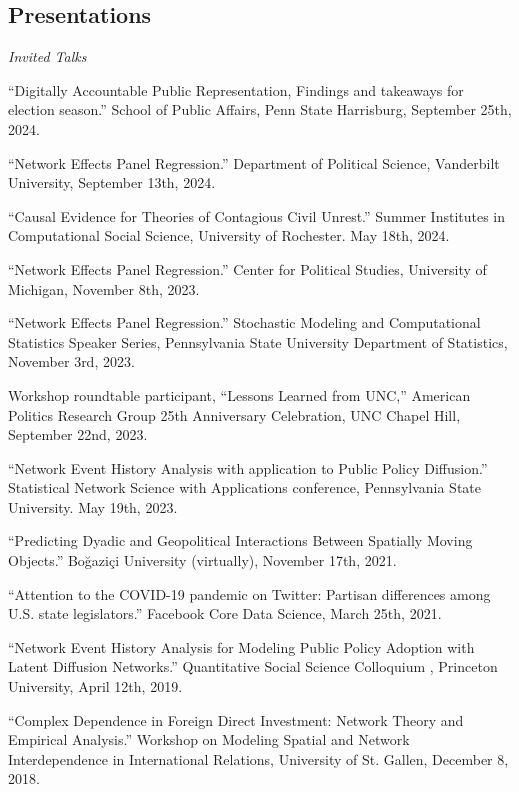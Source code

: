 \documentclass[overlapped,line]{res}
\begin{document}
\begin{resume}
\section{\bf Presentations}
\vspace{.1cm}
\hspace{-1cm} \emph{Invited Talks}
\begin{etaremune} 
\item ``Digitally Accountable Public Representation, Findings and takeaways for election season.'' School of Public Affairs, Penn State Harrisburg, September 25th, 2024. 
\item ``Network Effects Panel Regression.'' Department of Political Science, Vanderbilt University, September 13th, 2024.
\item ``Causal Evidence for Theories of Contagious Civil Unrest.'' Summer Institutes in Computational Social Science, University of Rochester. May 18th, 2024. 
\item ``Network Effects Panel Regression.'' Center for Political Studies, University of Michigan, November 8th, 2023.
\item ``Network Effects Panel Regression.'' Stochastic Modeling and Computational Statistics Speaker Series, Pennsylvania State University Department of Statistics, November 3rd, 2023.
\item Workshop roundtable participant, ``Lessons Learned from UNC,'' American Politics Research Group 25th Anniversary Celebration, UNC Chapel Hill, September 22nd, 2023. 
\item ``Network Event History Analysis with application to Public Policy Diffusion.'' Statistical Network Science with Applications conference, Pennsylvania State University. May 19th, 2023.
\item ``Predicting Dyadic and Geopolitical Interactions Between Spatially Moving Objects.'' Boğaziçi University (virtually), November 17th, 2021.
\item ``Attention to the COVID-19 pandemic on Twitter: Partisan differences among U.S. state legislators.'' Facebook Core Data Science, March 25th, 2021.
\item ``Network Event History Analysis for Modeling Public Policy Adoption with Latent Diffusion Networks.''  Quantitative Social Science Colloquium , Princeton University, April 12th, 2019.
\item ``Complex Dependence in Foreign Direct Investment: Network Theory and Empirical Analysis.'' Workshop on Modeling Spatial and Network Interdependence in International Relations, University of St. Gallen, December 8, 2018.

\end{etaremune}
\end{resume}
\end{document}
